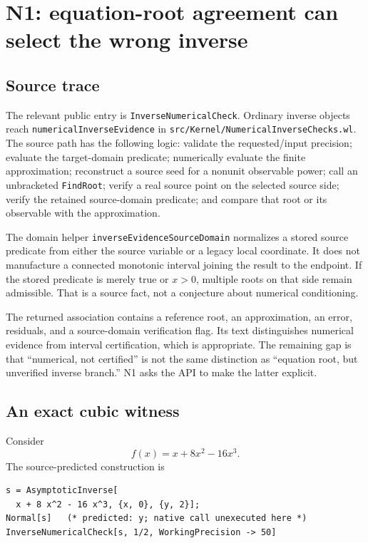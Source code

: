 \documentclass[11pt,letterpaper]{article}
\newcommand{\code}[1]{{\small\nolinkurl{#1}}}
\begin{document}
\section{N1: equation-root agreement can select the wrong inverse}
\label{sec:n1}

\subsection{Source trace}

The relevant public entry is \code{InverseNumericalCheck}. Ordinary inverse objects reach \code{numericalInverseEvidence} in \code{src/Kernel/NumericalInverseChecks.wl}. The source path has the following logic: validate the requested/input precision; evaluate the target-domain predicate; numerically evaluate the finite approximation; reconstruct a source seed for a nonunit observable power; call an unbracketed \code{FindRoot}; verify a real source point on the selected source side; verify the retained source-domain predicate; and compare that root or its observable with the approximation.\cite{numerical,core}

The domain helper \code{inverseEvidenceSourceDomain} normalizes a stored source predicate from either the source variable or a legacy local coordinate. It does not manufacture a connected monotonic interval joining the result to the endpoint. If the stored predicate is merely true or $x>0$, multiple roots on that side remain admissible. That is a source fact, not a conjecture about numerical conditioning.\cite{cert}

The returned association contains a reference root, an approximation, an error, residuals, and a source-domain verification flag. Its text distinguishes numerical evidence from interval certification, which is appropriate. The remaining gap is that ``numerical, not certified'' is not the same distinction as ``equation root, but unverified inverse branch.'' N1 asks the API to make the latter explicit.

\subsection{An exact cubic witness}

Consider
\begin{equation}
 f(x)=x+8x^2-16x^3.
 \label{eq:cubic}
\end{equation}
The source-predicted construction is
\begin{lstlisting}
s = AsymptoticInverse[
  x + 8 x^2 - 16 x^3, {x, 0}, {y, 2}];
Normal[s]   (* predicted: y; native call unexecuted here *)
InverseNumericalCheck[s, 1/2, WorkingPrecision -> 50]
\end{lstlisting}
\end{document}
